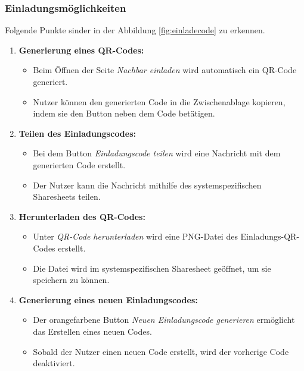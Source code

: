 \subsubsection{Einladungsmöglichkeiten}


Folgende Punkte sinder in der Abbildung
\ref{fig:einladecode} zu erkennen.


\begin{enumerate}[label=\arabic*.]
  \item \textbf{Generierung eines QR-Codes:}
        \begin{itemize}
          \item Beim Öffnen der Seite \textit{Nachbar einladen} wird automatisch ein QR-Code generiert.
          \item Nutzer können den generierten Code in die Zwischenablage kopieren, indem sie den Button neben dem Code betätigen.
        \end{itemize}

  \item \textbf{Teilen des Einladungscodes:}
        \begin{itemize}
          \item Bei dem Button \textit{Einladungscode teilen} wird eine Nachricht mit dem generierten Code erstellt.
          \item Der Nutzer kann die Nachricht mithilfe des systemspezifischen Sharesheets teilen.
        \end{itemize}

  \item \textbf{Herunterladen des QR-Codes:}
        \begin{itemize}
          \item Unter \textit{QR-Code herunterladen} wird eine PNG-Datei des Einladungs-QR-Codes erstellt.
          \item Die Datei wird im systemspezifischen Sharesheet geöffnet, um sie speichern zu können.
        \end{itemize}

  \item \textbf{Generierung eines neuen Einladungscodes:}
        \begin{itemize}
          \item Der orangefarbene Button \textit{Neuen Einladungscode generieren} ermöglicht das Erstellen eines neuen Codes.
          \item Sobald der Nutzer einen neuen Code erstellt, wird der vorherige Code deaktiviert.
        \end{itemize}
\end{enumerate}

